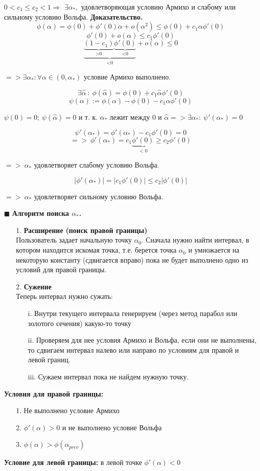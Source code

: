 $0<c_1\leq c_2<1 \Rightarrow$ \newline
$\exists \alpha_*,$ удовлетворяющая условию Армихо и слабому или сильному условию Вольфа.
\newline \textbf{Доказательство.}
$$\phi(\alpha)=\phi(0)+\phi'(0) \alpha + o(\alpha^2) \leq \phi(0)+c_1\alpha\phi'(0)$$
$$\phi'(0)+o(\alpha)\leq c_1 \phi'(0)$$
$$\underbrace{\underbrace{(1 -c_1)}_{\text{>0}}\underbrace{\phi'(0)}_{\text{<0}}}_{\text{<0}}+o(\alpha)\leq 0$$
\begin{center}
    $=> \exists \alpha_*: \forall \alpha \in (0, \alpha_*)$
    условие Армихо выполнено.
\end{center}
$$\exists \hat{\alpha} \ : \ \phi(\hat{\alpha})=\phi(0)+c_1 \hat{\alpha}  \phi'(0)$$
$$\psi(\alpha) := \phi(\alpha)-\phi(0)-c_1\alpha\phi'(0) $$
\begin{center}
    $\psi(0)=0; \ \psi(\hat{\alpha})=0$
    и т. к. $\alpha_*$ лежит между 0 и $\hat{\alpha} => \exists \alpha_* : \ \psi'(\alpha_*)=0$
\end{center}
$$\psi'(\alpha_*)=\phi'(\alpha_*)-c_1 \phi'(0)=0 $$
$$=> \ \phi'(\alpha_*)=c_1 \underbrace{\phi'(0)}_{<0} \geq c_2 \phi'(0)$$
\begin{center}
    $=> \ \alpha_*$ удовлетворяет слабому условию Вольфа.
\end{center}
$$|\phi'(\alpha_*)|=|c_1\phi'(0)|\leq c_2 |\phi'(0)|$$
\begin{center}
    $=> \ \alpha_*$ удовлетворяет сильному условию Вольфа.
\end{center}
\hfill$\scriptstyle\blacksquare$\newline
\textbf{Алгоритм поиска $\alpha_*$.}
\begin{itemize}
    \item[1.] \textbf{Расширение (поиск правой границы)} \\
    Пользователь задает начальную точку $\alpha_0$. Сначала нужно найти интервал, в котором находится искомая точка, т.е. берется точка $\alpha_0$ и умножается на некоторую константу (сдвигается вправо) пока не будет выполнено одно из условий для правой границы.
    \item[2.] \textbf{Сужение} \\
    Теперь интервал нужно сужать:
    \begin{itemize}
        \item[i.] Внутри текущего интервала генерируем (через метод парабол или золотого сечения) какую-то точку
        \item[ii.] Проверяем для нее условия Армихо и Вольфа, если они не выполнены, то сдвигаем интервал налево или направо по условиям для правой и левой границ.
        \item[iii.] Сужаем интервал пока не найдем нужную точку.
    \end{itemize}
\end{itemize}
\textbf{ Условия для правой границы:}
\begin{itemize}
    \item[1.] Не выполнено условие Армихо
    \item[2.] $\phi'(\alpha)>0$ и не выполнено условие Вольфа
    \item[3.] $\phi(\alpha)>\phi(\alpha_{prev})$
\end{itemize}
\textbf{ Условие для левой границы:} в левой точке $\phi'(\alpha)<0$